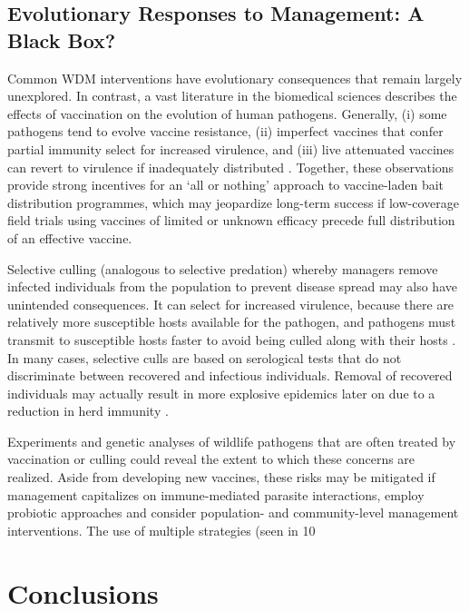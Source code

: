 \subsection{Evolutionary Responses to Management: A Black Box?}

Common WDM interventions have evolutionary consequences that remain largely unexplored.
In contrast, a vast literature in the biomedical sciences describes the effects of vaccination on the evolution of human pathogens.
Generally, (i) some pathogens tend to evolve vaccine resistance, (ii) imperfect vaccines that confer partial immunity select for increased virulence, and (iii) live attenuated vaccines can revert to virulence if inadequately distributed \citep{anderson1987epidemiology, gandon2007evolutionary, mackinnon2008virulence}.
Together, these observations provide strong incentives for an ‘all or nothing’ approach to vaccine-laden bait distribution programmes, which may jeopardize long-term success if low-coverage field trials using vaccines of limited or unknown efficacy precede full distribution of an effective vaccine.

Selective culling (analogous to selective predation) whereby managers remove infected individuals from the population to prevent disease spread may also have unintended consequences.
It can select for increased virulence, because there are relatively more susceptible hosts available for the pathogen, and pathogens must transmit to susceptible hosts faster to avoid being culled along with their hosts \citep{choo2003host}.
In many cases, selective culls are based on serological tests that do not discriminate between recovered and infectious individuals. Removal of recovered individuals may actually result in more explosive epidemics later on due to a reduction in herd immunity \citep{ebinger2011simulating}.

Experiments and genetic analyses of wildlife pathogens that are often treated by vaccination or culling could reveal the extent to which these concerns are realized.
Aside from developing new vaccines, these risks may be mitigated if management capitalizes on immune-mediated parasite interactions, employ probiotic approaches and consider population- and community-level management interventions.
The use of multiple strategies (seen in 10%

\section{Conclusions}

